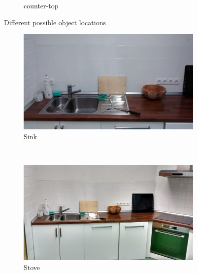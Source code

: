 \documentclass{article}
\begin{document}
{\begin{figure}
\begin{subfigure}[b]{0.3\textwidth}
        \caption{counter-top}
        \label{fig:counter-top}
    \end{subfigure}
    \caption{Different possible object locations}\label{fig:alllocations}
\end{figure}
\begin{figure}
    \centering
    \begin{subfigure}[b]{0.3\textwidth}
        \includegraphics[width=\textwidth]{images/sink.jpg}
        \caption{Sink}
        \label{fig:sink}
    \end{subfigure}
    ~ %
    \begin{subfigure}[b]{0.3\textwidth}
        \includegraphics[width=\textwidth]{images/stove.jpg}
        \caption{Stove}
        \label{fig:stove}
    \end{subfigure}
    ~ %
    \begin{subfigure}[b]{0.3\textwidth}

\end{subfigure}
\end{figure}}
\end{document}
